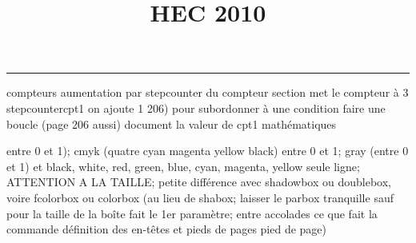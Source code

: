 \documentclass[11pt]{article}%
\title{\bf \vspace{-1cm} HEC 2010} %
\author{} %
\date{} %
\renewcommand{\headrulewidth}{0pt}%
\renewcommand{\footrulewidth}{0.4pt}%
\begin{document}
\maketitle %
\vspace{-1.2cm}\hrule %
\thispagestyle{fancy}

\vspace*{.4cm}


compteurs%
aumentation par stepcounter du compteur section%
met le compteur à 3%
stepcounter{cpt1} on ajoute 1%
206) pour subordonner à une condition %
faire une boucle (page 206 aussi) %
document la valeur de cpt1 
mathématiques\newcommand{\ch}{\operatorname{ch}} 
\newcommand{\sh}{\operatorname{sh}}
\renewcommand{\tanh}{\operatorname{th}}
\renewcommand{\sinh}{\operatorname{sh}}
\renewcommand{\cosh}{\operatorname{ch}}
\newcommand{\argsh}{\operatorname{argsh}}
\newcommand{\argch}{\operatorname{argch}}
\newcommand{\argth}{\operatorname{argth}}
\newcommand{\Id}{\operatorname{Id}}
\renewcommand{\leq}{\leq}
\renewcommand{\geq}{\geq }

\newcommand{\dlim}{\lim}
\newcommand{\dsum}{\sum}
\newcommand{\dprod}{\prod}



entre 0 et 1); cmyk (quatre cyan magenta yellow black) entre 0 et 1;
gray (entre 0 et 1) et black, white, red, green, blue, cyan, magenta,
yellow%
seule ligne; ATTENTION A LA TAILLE; petite différence avec shadowbox ou
doublebox, voire fcolorbox ou colorbox (au lieu de shabox; laisser le
parbox tranquille sauf pour la taille de la boîte
\newcommand{\Tbox}[1]{\begin{center} \shabox{\parbox{0.6
\linewidth}{#1}} \end{center}} %
fait le 1er paramètre; entre accolades ce que fait la commande
définition des en-têtes et pieds de pages\pagestyle{fancy}
\chead{}
\rfoot[ \ \thepage]{\thepage}
\cfoot{}
\lfoot{}
\thispagestyle{fancy} %
pied de page)\renewcommand{\footrulewidth}{0.4pt}
\renewcommand{\headrulewidth}{0.4pt}
\end{document}
